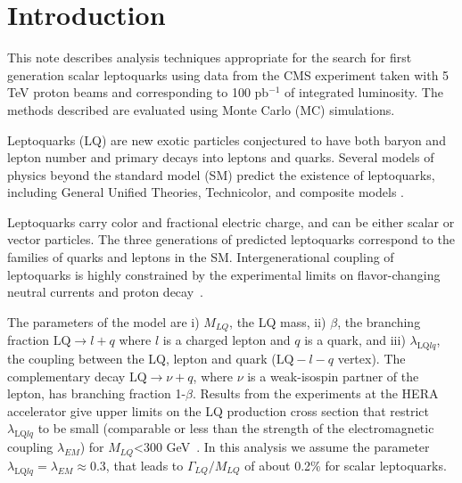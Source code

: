 \setcounter{page}{2}%

\section{Introduction}
This note describes analysis techniques 
appropriate for the
search for first generation scalar leptoquarks 
using data from the CMS experiment taken with 5 TeV proton beams and 
corresponding to 100 pb$^{-1}$ of integrated luminosity.
The methods described are evaluated using 
Monte Carlo (MC) simulations.

%
Leptoquarks (LQ) are new exotic particles conjectured to have both baryon and lepton number 
and primary decays into leptons and quarks. 
Several models of physics beyond the standard model (SM) predict the existence of leptoquarks,
including General Unified Theories, Technicolor, and composite models \cite{Acosta:1999ws}.  

Leptoquarks carry color and fractional electric charge, 
and can be either scalar or vector particles. The three generations of predicted leptoquarks 
correspond to the families of quarks and leptons in the SM.  Intergenerational coupling of 
leptoquarks is highly constrained by the experimental limits on flavor-changing neutral currents
and proton decay~\cite{Acosta:1999ws,Davidson:1993qk}. 


The parameters of the model are i) $M_{LQ}$, the LQ mass, ii) $\beta$, 
the branching fraction 
$\mbox{LQ} \rightarrow l + q$
where $l$ is a charged lepton and $q$ is a quark, and
iii) $\lambda_{\mbox{LQ}lq}$, the coupling between the LQ, lepton and 
quark ($\mbox{LQ}-l-q$ vertex). 
The complementary decay $\mbox{LQ} \rightarrow \nu + q$, 
where $\nu$ is a weak-isospin partner of the lepton,
has branching fraction 1-$\beta$.
Results from the experiments at the HERA accelerator
give upper limits on the LQ production cross section that restrict  
$\lambda_{\mbox{LQ}lq}$ to be small (comparable or less than the strength of 
the electromagnetic coupling $\lambda_{EM}$) for $M_{LQ}$<300 GeV~\cite{Aktas:2005pr}. 
In this analysis we assume the parameter 
$\lambda_{\mbox{LQ}lq} = \lambda_{EM} \approx 0.3$, 
that leads to $\Gamma_{LQ}/M_{LQ}$ of about 0.2\% for scalar leptoquarks. 


